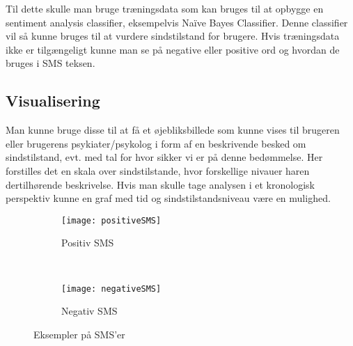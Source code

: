Til dette skulle man bruge træningsdata som kan bruges til at opbygge en sentiment analysis classifier, eksempelvis Naïve Bayes Classifier. Denne classifier vil så kunne bruges til at vurdere sindstilstand for brugere. Hvis træningsdata ikke er tilgængeligt kunne man se på negative eller positive ord og hvordan de bruges i SMS teksen.

\subsection{Visualisering}
Man kunne bruge disse til at få et øjebliksbillede som kunne vises til brugeren eller brugerens psykiater/psykolog i form af en beskrivende besked om sindstilstand, evt. med tal for hvor sikker vi er på denne bedømmelse. Her forstilles det en skala over sindstilstande, hvor forskellige nivauer haren dertilhørende beskrivelse.
Hvis man skulle tage analysen i et kronologisk perspektiv kunne en graf med tid og sindstilstandsniveau være en mulighed. 

\begin{figure}
	\centering
	\begin{subfigure}[b]{0.4\textwidth}
		\texttt{[image: positiveSMS]}
		\caption{Positiv SMS}
	\end{subfigure}
	~
	\begin{subfigure}[b]{0.4\textwidth}
		\texttt{[image: negativeSMS]}
		\caption{Negativ SMS}
	\end{subfigure}
	\caption{Eksempler på SMS'er}
\end{figure}
	
	